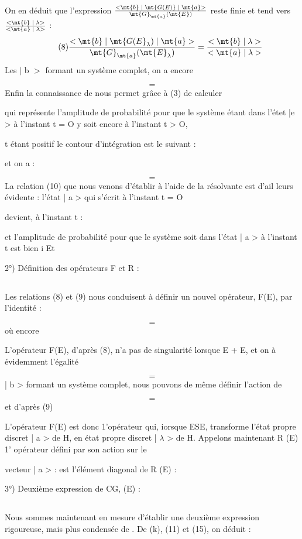 On en déduit que l'expression $\frac{<\mt{b}\;|\;\mt{G(E)}\;|\;\mt{a}>}{\mt{G}_\mt{a}(\mt{E})}$
reste finie et tend vers $\frac{<\mt{b}\;|\;\lambda>}{<\mt{a}\;|\;\lambda>}$ :
\[
\tag{8}\frac{<\mt{b}\;|\;\mt{G(E}_\lambda)\;|\;\mt{a}>}{\mt{G}_\mt{a}(\mt{E}_\lambda)}=
\frac{<\mt{b}\;|\;\lambda>}{<\mt{a}\;|\;\lambda>}
\]
Les $|$ b $>$ formant un système complet, on a encore

\[
\tag{9}=
\]
Enfin la connaissance de  nous permet grâce à (3) de calculer

qui représente l'amplitude de probabilité pour que le système étant dans l'étet |e >
à l'instant t = O y soit encore à l'instant t > O,

t étant positif le contour d'intégration est le suivant :

et on a :

\[
\tag{10}=
\]
La relation (10) que nous venons d'établir à l'aide de la résolvante est d'ail
leurs évidente : l'état | a > qui s'écrit à l'instant t = O

devient, à l'instant t :

et l'amplitude de probabilité pour que le système soit dans l'état | a > à l'instant t est bien i Et

2°) Définition des opérateurs F et R :

\subsection{}%
Les relations (8) et (9) nous conduisent à définir un nouvel opérateur, F(E), par l'identité :

\[
\tag{11-a}=
\]
où encore

L'opérateur F(E), d'après (8), n'a pas de singularité lorsque E + E, et on à évidemment l'égalité

\[
\tag{12}=
\]
| b > formant un système complet, nous pouvons de même définir l'action de

\[
\tag{13}=
\]
et d'après (9)

L'opérateur F(E) est donc 1'opérateur qui, iorsque ESE, transforme l'état propre discret | a > de H, en état propre discret | $\lambda$ > de H.
Appelons maintenant R (E) 1' opérateur défini par son action sur le

vecteur | a > :
 est l'élément diagonal de R (E) :

3°) Deuxième expression de CG, (E) :
\subsection{}%
Nous sommes maintenant en mesure d'établir une deuxième expression
rigoureuse, mais plus condensée de .
De (k), (11) et (15), on déduit :

